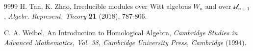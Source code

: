 \documentclass[12pt,reqno]{amsart}
\numberwithin{equation}{section}
\begin{document}
\begin{thebibliography}{9999}
 H. Tan,  K. Zhao,
Irreducible  modules over Witt algebras
$W_n$ and over  $\mathcal{sl}_{n+1}$,
{\it Algebr. Represent. Theory} {\bf21} (2018),   787-806.
%
%



C. A. Weibel,
An Introduction to Homological Algebra,
{\it Cambridge Studies in Advanced Mathematics, Vol. 38,
Cambridge University Press, Cambridge}
 (1994).














 



 
 







 

 
 
 
 



 
 


 







 




 







 








 









\end{thebibliography}
\end{document}
